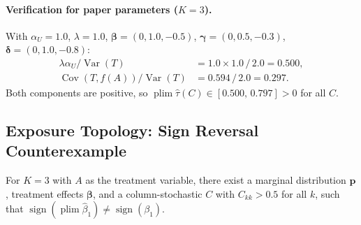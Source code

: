 \paragraph{Verification for paper parameters ($K{=}3$).}
With $\alpha_U{=}1.0$, $\lambda{=}1.0$, $\boldsymbol{\beta}{=}(0,1.0,{-}0.5)$, $\boldsymbol{\gamma}{=}(0,0.5,{-}0.3)$, $\boldsymbol{\delta}{=}(0,1.0,{-}0.8)$:
\begin{align*}
  \lambda\alpha_U/\operatorname{Var}(T) &= 1.0\times 1.0\,/\,2.0 = 0.500,\\
  \operatorname{Cov}(T,f(A))/\operatorname{Var}(T) &= 0.594\,/\,2.0 = 0.297.
\end{align*}
Both components are positive, so $\operatorname{plim}\hat\tau(C)\in[0.500,\,0.797]>0$ for all $C$.

\subsection{Exposure Topology: Sign Reversal Counterexample}
\label{app:exposure}

\begin{proposition}
\label{prop:exp_counter}
For $K{=}3$ with $A$ as the treatment variable, there exist a marginal distribution $\mathbf{p}$, treatment effects $\boldsymbol{\beta}$, and a column-stochastic $C$ with $C_{kk}>0.5$ for all $k$, such that $\operatorname{sign}(\operatorname{plim}\hat\beta_1)\neq\operatorname{sign}(\beta_1)$.
\end{proposition}

